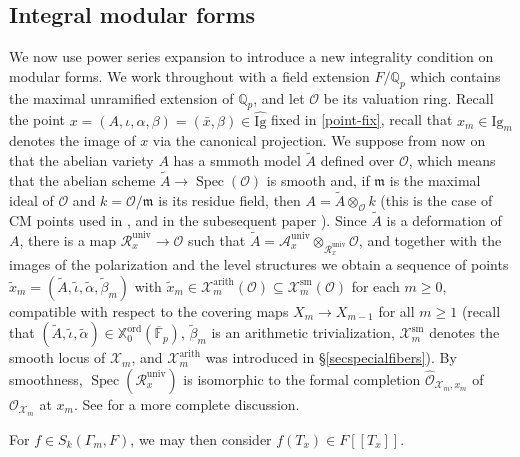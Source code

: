 \documentclass[a4paper,11pt]{amsart}
\numberwithin{equation}{section}
\theoremstyle{plain}
\theoremstyle{definition}
\theoremstyle{remark}
\newcommand{\Q}{\mathbb{Q}}
\newcommand{\F}{\mathbb{F}}
\DeclareMathOperator{\Spec}{Spec}
\begin{document}
\subsection{Integral modular forms}
We now use power series expansion to introduce a new integrality condition on modular forms. We work throughout with a field extension $F/\Q_p$ which contains the maximal unramified extension of $\Q_p$, and let $\mathcal{O}$ be its valuation ring. Recall the point $x=(A,\iota,\alpha,\beta)=(\bar{x},\beta)\in\widehat{\mathrm{Ig}}$ fixed in \eqref{point-fix}, 
recall that $x_m\in\mathrm{Ig}_m$ denotes the image of $x$ via the canonical projection. 
We suppose from now on that the abelian variety $A$ has a smmoth model $\widetilde{A}$ 
defined over $\mathcal{O}$, which means that the abelian scheme $\widetilde{A}\rightarrow \Spec(\mathcal{O})$ is 
smooth and, if $\mathfrak{m}$ is the maximal ideal of 
$\mathcal{O}$ and $k=\mathcal{O}/\mathfrak{m}$ is its residue field, 
then $A=\widetilde{A}\otimes_\mathcal{O}k$ (this is the case 
of CM points used in \cite{Mori}, \cite{Mori1} and in the subesequent paper \cite{LMW}). 
Since $\widetilde{A}$ is a deformation of $A$, there 
is a map $\mathcal{R}_x^\mathrm{univ}\rightarrow\mathcal{O}$ 
such that $\widetilde{A}=\mathcal{A}_x^\mathrm{univ}\otimes_{\mathcal{R}_x^\mathrm{univ}}\mathcal{O}$, and together with the images of the polarization and the level structures 
we obtain a sequence of points $\tilde{x}_m=(\widetilde{A},\tilde\iota,\tilde\alpha,\tilde\beta_m)$
with $\tilde{x}_m\in \mathcal{X}_m^\mathrm{arith}(\mathcal{O})\subseteq\mathcal{X}_m^\mathrm{sm}(\mathcal{O})$ for each $m\geq 0$, 
compatible with respect to the covering maps $X_m\rightarrow X_{m-1}$ for all $m\geq 1$
(recall that $(\widetilde{A},\tilde{\iota},\tilde{\alpha})\in \mathbb{X}_0^{\mathrm{ord}}(\overline{\F}_p)$, $\tilde{\beta}_m$ is an arithmetic trivialization, 
$\mathcal{X}_m^\mathrm{sm}$ denotes the smooth locus of $\mathcal{X}_m$, 
and $\mathcal{X}_m^\mathrm{arith}$ was introduced in \S\ref{secspecialfibers}). 
By smoothness,  
$\Spec(\mathcal{R}_x^\mathrm{univ})$ 
is isomorphic to the formal completion $\widehat{\mathcal{O}}_{\mathcal{X}_m,x_m}$ 
of $\mathcal{O}_{\mathcal{X}_m}$ at $x_m$. See \cite[\S2.2]{Mori1} for a more complete discussion. 

For $f\in S_k(\Gamma_m,F)$, we may then consider $f(T_{x})\in F[[T_{x}]]$. 
\end{document}
